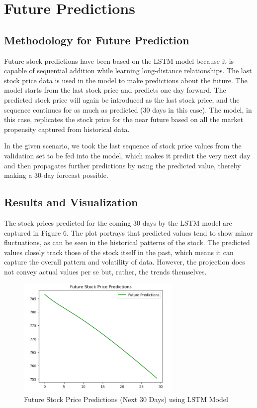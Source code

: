 \documentclass[10pt,twocolumn,a4paper]{article}
\begin{document}
\section{Future Predictions}

\subsection{Methodology for Future Prediction}
Future stock predictions have been based on the LSTM model because it is capable of sequential addition while learning long-distance relationships. The last stock price data is used in the model to make predictions about the future. The model starts from the last stock price and predicts one day forward. The predicted stock price will again be introduced as the last stock price, and the sequence continues for as much as predicted (30 days in this case). The model, in this case, replicates the stock price for the near future based on all the market propensity captured from historical data.

In the given scenario, we took the last sequence of stock price values from the validation set to be fed into the model, which makes it predict the very next day and then propagates further predictions by using the predicted value, thereby making a 30-day forecast possible.

\subsection{Results and Visualization}
The stock prices predicted for the coming 30 days by the LSTM model are captured in Figure 6. The plot portrays that predicted values tend to show minor fluctuations, as can be seen in the historical patterns of the stock. The predicted values closely track those of the stock itself in the past, which means it can capture the overall pattern and volatility of data. However, the projection does not convey actual values per se but, rather, the trends themselves.

\begin{figure}[htbp]
    \centering
    \includegraphics[width=0.7\textwidth]{future_prediction.png}
    \caption{Future Stock Price Predictions (Next 30 Days) using LSTM Model}
    \label{fig:future_predictions}
\end{figure}
\end{document}
